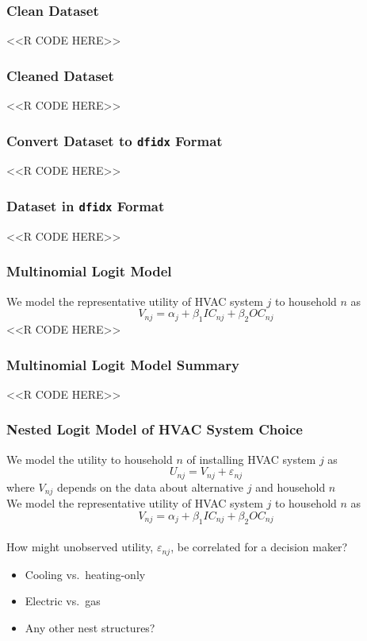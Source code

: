 \documentclass{beamer}
\begin{document}
\begin{frame}[fragile]\frametitle{Clean Dataset}
    <<R CODE HERE>>
\end{frame}

\begin{frame}[fragile]\frametitle{Cleaned Dataset}
    <<R CODE HERE>>
\end{frame}

\begin{frame}[fragile]\frametitle{Convert Dataset to \texttt{dfidx} Format}
    <<R CODE HERE>>
\end{frame}

\begin{frame}[fragile]\frametitle{Dataset in \texttt{dfidx} Format}
    <<R CODE HERE>>
\end{frame}

\begin{frame}[fragile]\frametitle{Multinomial Logit Model}
    We model the representative utility of HVAC system $j$ to household $n$ as
    $$V_{nj} = \alpha_j + \beta_1 IC_{nj} + \beta_2 OC_{nj}$$
    <<R CODE HERE>>
\end{frame}

\begin{frame}[fragile]\frametitle{Multinomial Logit Model Summary}
    <<R CODE HERE>>
\end{frame}

\begin{frame}\frametitle{Nested Logit Model of HVAC System Choice}
    We model the utility to household $n$ of installing HVAC system $j$ as
    $$U_{nj} = V_{nj} + \varepsilon_{nj}$$
    where $V_{nj}$ depends on the data about alternative $j$ and household $n$ \\
    \vspace{3ex}
    We model the representative utility of HVAC system $j$ to household $n$ as
    $$V_{nj} = \alpha_j + \beta_1 IC_{nj} + \beta_2 OC_{nj}$$ \\
    \vspace{2ex}
    How might unobserved utility, $\varepsilon_{nj}$, be correlated for a decision maker?
    \begin{itemize}
    	\item Cooling vs.\ heating-only
    	\item Electric vs.\ gas
    	\item Any other nest structures?
    \end{itemize}
\end{frame}
\end{document}
